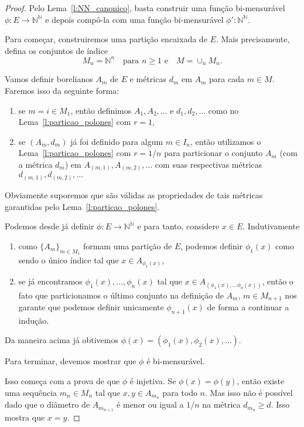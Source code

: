 \documentclass[reqno]{article}
\newcommand*\1{\mathds{1}}
\begin{document}
\begin{proof}
  Pelo Lema~\ref{l:NN_canonico}, basta construir uma função bi-mensurável $\phi:E \to \mathbb{N}^\mathbb{N}$ e depois compô-la com uma função bi-mensurável $\phi':\mathbb{N}^\mathbb{N}$.

  Para começar, construiremos uma partição encaixada de $E$.
  Mais precisamente, defina os conjuntos de índice
  \begin{equation}
    M_n = \mathbb{N}^n \quad \text{para $n \geq 1$ e} \quad M = \cup_n M_n.
  \end{equation}

  Vamos definir borelianos $A_m$ de $E$ e métricas $d_m$ em $A_m$ para cada $m \in M$.
  Faremos isso da seguinte forma:
  \begin{enumerate}
  \item se $m = i \in M_1$, então definimos $A_1, A_2, \dots$ e $d_1, d_2, \dots$ como no Lema~\ref{l:particao_polones} com $r = 1$,
  \item se $(A_m, d_m)$ já foi definido para algum $m \in I_n$, então utilizamos o Lema~\ref{l:particao_polones} com $r = 1/n$ para particionar o conjunto $A_m$ (com a métrica $d_m$) em $A_{(m,1)}, A_{(m,2)}, \dots$ com suas respectivas métricas $d_{(m,1)}, d_{(m,2)}, \dots$
  \end{enumerate}
  Obviamente suporemos que são válidas as propriedades de tais métricas garantidas pelo Lema~\ref{l:particao_polones}.

  Podemos desde já definir $\phi:E \to \mathbb{N}^\mathbb{N}$ e para tanto, considere $x \in E$.
  Indutivamente
  \begin{enumerate}
  \item como $\{A_m\}_{m \in M_1}$ formam uma partição de $E$, podemos definir $\phi_1(x)$ como sendo o único índice tal que $x \in A_{\phi_1(x)}$,
  \item se já encontramos $\phi_1(x), \dots, \phi_n(x)$ tal que $x \in A_{(\phi_1(x), \dots \phi_n(x))}$, então o fato que particionamos o último conjunto na definição de $A_m$, $m \in M_{n+1}$ nos garante que podemos definir unicamente $\phi_{n+1}(x)$ de forma a continuar a indução.
  \end{enumerate}
  Da maneira acima já obtivemos $\phi(x) = (\phi_1(x), \phi_2(x), \dots)$.

  Para terminar, devemos mostrar que $\phi$ é bi-mensurável.

  Isso começa com a prova de que $\phi$ é injetiva.
  Se $\phi(x) = \phi(y)$, então existe uma sequência $m_n \in M_n$ tal que $x, y \in A_{m_n}$ para todo $n$.
  Mas isso não é possível dado que o diâmetro de $A_{m_{n+1}}$ é menor ou igual a $1/n$ na métrica $d_{m_n} \geq d$.
  Isso mostra que $x = y$.


\end{proof}
\end{document}
